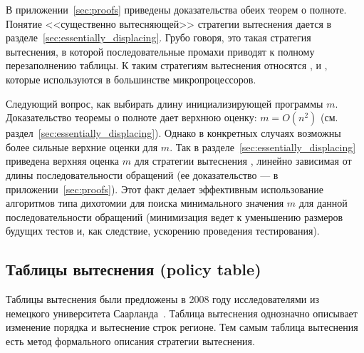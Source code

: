 \begin{theorem}\label{mirror_fullness_none}
\FullnessMirrorNone
\end{theorem}

\begin{theorem}\label{mirror_fullness}
\FullnessMirror
\end{theorem}

В приложении~\ref{sec:proofs} приведены доказательства обеих теорем о полноте. Понятие <<существенно вытесняющей>> стратегии вытеснения дается в разделе~\ref{sec:essentially_displacing}. Грубо говоря, это такая стратегия вытеснения, в которой последовательные промахи приводят к полному перезаполнению таблицы. К таким стратегиям вытеснения относятся \LRU, \FIFO и \PseudoLRU, которые используются в большинстве микропроцессоров.

Следующий вопрос, как выбирать длину инициализирующей программы $m$. %
Доказательство теоремы о полноте дает верхнюю оценку: $m = O(n^2)$ (см. раздел~\ref{sec:essentially_displacing}). Однако в конкретных случаях возможны более сильные верхние оценки для $m$. Так в разделе~\ref{sec:essentially_displacing} приведена верхняя оценка $m$ для стратегии вытеснения \LRU, линейно зависимая от длины последовательности обращений (ее доказательство --- в приложении~\ref{sec:proofs}). Этот факт делает эффективным использование алгоритмов типа дихотомии для поиска минимального значения $m$ для данной последовательности обращений (минимизация ведет к уменьшению размеров будущих тестов и, как следствие, ускорению проведения тестирования).

\subsection{Таблицы вытеснения (policy table)}

Таблицы вытеснения были предложены в 2008 году исследователями из немецкого университета Саарланда~\cite{policy_tables}. Таблица вытеснения однозначно описывает изменение порядка и вытеснение строк регионе. Тем самым таблица вытеснения есть метод формального описания стратегии вытеснения.

